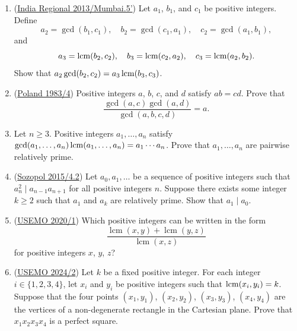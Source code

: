 \documentclass[11pt,paper=letter]{scrartcl}
\begin{document}
\begin{enumerate}

\item (\href{https://artofproblemsolving.com/community/c6h573989p3379016}{India Regional 2013/Mumbai.5'}) Let $a_1$, $b_1$, and $c_1$ be positive integers. Define \[
  a_2 = \gcd(b_1, c_1), \quad b_2 = \gcd(c_1, a_1), \quad c_2 = \gcd(a_1, b_1),
\] and \[
  a_3 = \operatorname*{lcm}(b_2, c_2), \quad b_3 = \operatorname*{lcm}(c_2, a_2), \quad c_3 = \operatorname*{lcm}(a_2, b_2).
\]
Show that $a_2\gcd(b_2, c_2) = a_3\operatorname*{lcm}(b_3, c_3)$.

\item (\href{https://artofproblemsolving.com/community/c1068820h2015396p14143702}{Poland 1983/4}) Positive integers $a$, $b$, $c$, and $d$ satisfy $ab = cd$. Prove that $$\frac{\gcd(a,c)\gcd(a,d)}{\gcd(a,b,c,d)} = a.$$

\item Let $n \ge 3$. Positive integers $a_1, \ldots, a_n$ satisfy $\gcd(a_1, \ldots, a_n)\operatorname*{lcm}(a_1, \ldots, a_n) = a_1 \cdots a_n$. Prove that $a_1, \ldots, a_n$ are pairwise relatively prime.

\item (\href{https://artofproblemsolving.com/community/c6h1978376p13737797}{Sozopol 2015/4.2}) Let $a_0, a_1, \ldots$ be a sequence of positive integers such that $a_n^2 \mid a_{n-1}a_{n+1}$ for all positive integers $n$. Suppose there exists some integer $k \ge 2$ such that $a_1$ and $a_k$ are relatively prime. Show that $a_1 \mid a_0$. \hint{\ref{h:4-1}}

\item (\href{https://artofproblemsolving.com/community/c6h2317634p18471128}{USEMO 2020/1}) Which positive integers can be written in the form \[\frac{\operatorname{lcm}(x, y) + \operatorname{lcm}(y, z)}{\operatorname{lcm}(x, z)}\]for positive integers $x$, $y$, $z$? \hint{\ref{h:5-1}}

\item (\href{https://artofproblemsolving.com/community/c6h3429772p33040073}{USEMO 2024/2}) Let $k$ be a fixed positive integer. For each integer $i \in \{1, 2, 3, 4\}$, let $x_i$ and $y_i$ be positive integers such that $\operatorname*{lcm}(x_i, y_i) = k$. Suppose that the four points $(x_1, y_1)$, $(x_2, y_2)$, $(x_3, y_3)$, $(x_4, y_4)$ are the vertices of a non-degenerate rectangle in the Cartesian plane. Prove that $x_1x_2x_3x_4$ is a perfect square. \hint{\ref{h:6-1}}

\end{enumerate}
\end{document}
